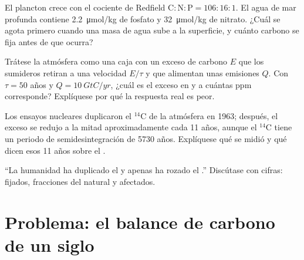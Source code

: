 \begin{exercise}[$\star\star$]\label{exo:b2:biogeochemical-cycles:9}
El plancton crece con el cociente de Redfield $\mathrm{C:N:P} = 106:16:1$.
El agua de mar profunda contiene \qty{2.2}{\micro mol/kg} de fosfato y
\qty{32}{\micro mol/kg} de nitrato. ¿Cuál se agota primero cuando una masa
de agua sube a la superficie, y cuánto carbono se fija antes de que ocurra?
\end{exercise}

\begin{exercise}[$\star\star\star$]\label{exo:b2:biogeochemical-cycles:10}
Trátese la atmósfera como una caja con un exceso de carbono $E$ que los
sumideros retiran a una velocidad $E/\tau$ y que alimentan unas emisiones
$Q$. Con $\tau =
50$ años y $Q = \qty{10}{GtC/yr}$, ¿cuál es el exceso en  y a cuántas ppm corresponde? Explíquese por qué la respuesta
real es peor.
\end{exercise}

\begin{exercise}[$\star\star\star$]\label{exo:b2:biogeochemical-cycles:11}
Los ensayos nucleares duplicaron el $\mathrm{{}^{14}C}$ de la atmósfera en 1963;
después, el exceso se redujo a la mitad aproximadamente cada 11 años,
aunque el $\mathrm{{}^{14}C}$
tiene un periodo de semidesintegración de 5730 años. Explíquese qué se
midió y qué dicen esos 11 años sobre el .
\end{exercise}

\begin{exercise}[$\star\star\star$]\label{exo:b2:biogeochemical-cycles:12}
``La humanidad ha duplicado el  y apenas ha rozado el
.'' Discútase con cifras:  fijados, fracciones del
 natural y  afectados.
\end{exercise}

\section{Problema: el balance de carbono de un siglo}

